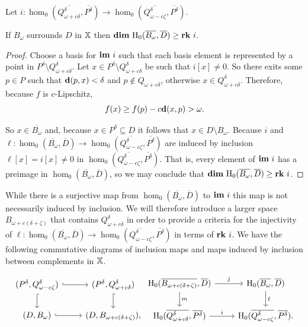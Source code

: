 \begin{lemma}\label{lem:psurj}
  Let $i : \hom_0(\overline{Q_{\omega+c\delta}^\delta}, \overline{P^\delta})\to \hom_0(\overline{Q_{\omega-c\zeta}^\delta}, \overline{P^\delta})$.

  If $B_\omega$ surrounds $D$ in $\mathbb{X}$ then $\mathbf{dim}~\mathrm{H}_0(\overline{B_\omega}, \overline{D})\geq \mathbf{rk}~i$.
\end{lemma}
\begin{proof}
  Choose a basis for $\mathbf{im}~i$ such that each basis element is represented by a point in $P^\delta\setminus Q_{\omega+c\delta}^\delta$.
  Let $x\in P^\delta\setminus Q_{\omega+c\delta}^\delta$ be such that $i[x] \neq 0$.
  So there exits some $p\in P$ such that $\mathbf{d}(p, x) < \delta$ and $p\notin Q_{\omega+c\delta}$, otherwise $x\in Q_{\omega+c\delta}^\delta$.
  Therefore, because $f$ is $c$-Lipschitz,
  \[ f(x)\geq f(p) - c\mathbf{d}(x, p) > \omega.\]

  So $x\in\overline{B_\omega}$ and, because $x\in P^\delta\subseteq D$ it follows that $x\in D\setminus B_\omega$.
  Because $i$ and $\ell : \hom_0(\overline{B_\omega}, \overline{D})\to \hom_0(\overline{Q_{\omega-c\zeta}^\delta}, \overline{P^\delta})$ are induced by inclusion $\ell[x] = i[x]\neq 0$ in $\hom_0(\overline{Q_{\omega-c\zeta}^\delta}, \overline{P^\delta})$.
  That is, every element of $\mathbf{im}~i$ has a preimage in $\hom_0(\overline{B_\omega}, \overline{D})$, so we may conclude that $\mathbf{dim}~\mathrm{H}_0(\overline{B_\omega}, \overline{D})\geq \mathbf{rk}~i$.
\end{proof}

While there is a surjective map from $\hom_0(\overline{B_\omega}, \overline{D})$ to $\mathbf{im}~i$ this map is not necessarily induced by inclusion.
We will therefore introduce a larger space $B_{\omega+c(\delta+\zeta)}$ that contains $Q_{\omega+c\delta}^\delta$ in order to provide a criteria for the injectivity of $\ell : \hom_0(\overline{B_\omega}, \overline{D})\to\hom_0(\overline{Q_{\omega-c\zeta}^\delta}, \overline{P^\delta})$ in terms of $\mathbf{rk}~i$.
We have the following commutative diagrams of inclusion maps and maps induced by inclusion between complements in $\mathbb{X}$.

\begin{equation}\label{dgm:1}
\begin{tikzcd}
  (P^\delta, Q_{\omega-c\zeta}^\delta) \arrow[hookrightarrow]{r}\arrow[hookrightarrow]{d} &
  (P^\delta, Q_{\omega+c\delta}^\delta) \arrow[hookrightarrow]{d} \\
  (D, B_\omega) \arrow[hookrightarrow]{r} &
  (D, B_{\omega+c(\delta+\zeta)}),
\end{tikzcd}
\begin{tikzcd}
  \hom_0(\overline{B_{\omega+c(\delta+\zeta)}},\overline{D})\arrow{d}{m} \arrow{r}{j} &
  \hom_0(\overline{B_\omega}, \overline{D}) \arrow{d}{\ell} \\
  \hom_0(\overline{Q_{\omega+c\delta}^\delta}, \overline{P^\delta}) \arrow{r}{i} &
  \hom_0(\overline{Q_{\omega-c\zeta}^\delta}, \overline{P^\delta}).
\end{tikzcd}\end{equation}

